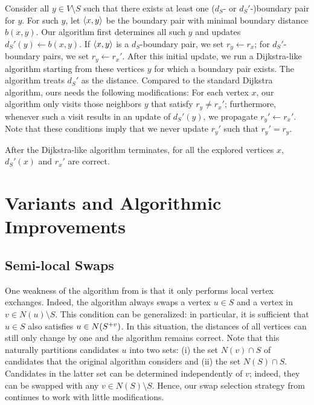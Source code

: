 Consider all $y \in V \setminus S$ such that there exists at least one
($d_S$- or $d_S'$-)boundary pair for $y$. For such $y$, let $\pair{x}{y}$ be
the boundary pair with minimal boundary distance $b(x, y)$.
Our algorithm first determines all such $y$ and updates $d_S'(y) \gets b(x,
y)$. If $\pair{x}{y}$ is a $d_S$-boundary pair, we set $r_y \gets r_x$; for
$d_S'$-boundary pairs, we set $r_y \gets r_x'$. After this initial update, we
run a Dijkstra-like algorithm starting from these vertices $y$ for which a
boundary pair exists.
%
The algorithm treats $d_S'$ as the distance. Compared to the standard Dijkstra
algorithm, ours needs the following modifications: For each vertex $x$, our
algorithm only visits those neighbors $y$ that satisfy $r_y \neq r_x'$;
furthermore, whenever such a visit results in an update of $d_S'(y)$, we
propagate $r_y' \gets r_x'$. Note that these conditions imply that we never
update $r_y'$ such that $r_y' = r_y$.

\begin{lemma}
\label{lemma:lsh-gc-dijkstra}
After the Dijkstra-like algorithm terminates, for all the explored vertices
$x$, $d_S'(x)$ and $r_x'$ are correct.
\end{lemma}


\section{Variants and Algorithmic Improvements}
\label{sec:lsh-gc-variants}
%
\subsection{Semi-local Swaps}
%
One weakness of the \localswaps algorithm from  is
that it only performs local vertex exchanges. Indeed, the algorithm always
swaps a vertex $u\in S$ and a vertex in $v\in N(u) \setminus S$. This condition
can be generalized: in particular, it is sufficient that $u\in S$ also satisfies
$u \in N(S^{+v})$.
%
In this situation, the distances of all vertices can still only change by one
and the algorithm remains correct. Note that this naturally partitions
candidates $u$ into two sets: (i) the set $N(v) \cap S$ of candidates that
the original algorithm considers and (ii) the set $N(S) \cap S$.
Candidates in the latter set can be determined independently of $v$; indeed, they can
be swapped with any $v \in N(S) \setminus S$. Hence, our swap selection strategy
from  continues to work with little modifications.


